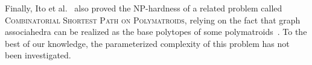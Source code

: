\documentclass[a4paper,UKenglish,cleveref, autoref, thm-restate]{lipics-v2021}
\newcommand{\NP}{\mathcal{NP}}
\renewcommand{\NP}{{\sf NP}\xspace}
\begin{document}
Finally, Ito et al.~\cite{ito_et_al:LIPIcs.ICALP.2023.82} also proved the \NP-hardness of a related problem called \textsc{Combinatorial Shortest Path on Polymatroids}, relying on the fact that graph associahedra can be realized as the base polytopes
of some polymatroids~\cite{PostnikovRW08}. To the best of our knowledge, the parameterized complexity of this problem has not been investigated.






\end{document}
